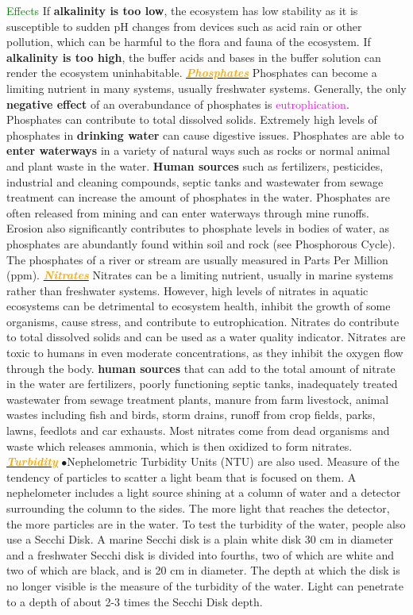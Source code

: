 \documentclass{article}
\newcommand{\ddd}{$\bullet$}
\newcommand{\green}[1]{\textcolor{green}{#1}}
\newcommand{\pink}[1]{\textcolor{magenta}{#1}}
\newcommand{\orange}[1]{\textcolor{orange}{#1}}
\newcommand{\mysubsection}[1]{\underline{\textbf{{\textit{\orange{#1}}}}}}
\newcommand{\mysubsub}[1]{{{\green{#1}}}}
\begin{document}
\begin{multicols*}{4}
            \mysubsub{Effects} If \textbf{alkalinity is too low}, the ecosystem has low stability as it is susceptible to sudden pH changes from devices such as acid rain or other pollution, which can be harmful to the flora and fauna of the ecosystem. If \textbf{alkalinity is too high}, the buffer acids and bases in the buffer solution can render the ecosystem uninhabitable.
        \mysubsection{Phosphates}
            Phosphates can become a limiting nutrient in many systems, usually freshwater systems. Generally, the only \textbf{negative effect} of an overabundance of phosphates is \pink{eutrophication}. Phosphates can contribute to total dissolved solids. Extremely high levels of phosphates in \textbf{drinking water} can cause digestive issues. Phosphates are able to \textbf{enter waterways} in a variety of natural ways such as rocks or normal animal and plant waste in the water. \textbf{Human sources} such as fertilizers, pesticides, industrial and cleaning compounds, septic tanks and wastewater from sewage treatment can increase the amount of phosphates in the water. Phosphates are often released from mining and can enter waterways through mine runoffs. Erosion also significantly contributes to phosphate levels in bodies of water, as phosphates are abundantly found within soil and rock (see Phosphorous Cycle). The phosphates of a river or stream are usually measured in Parts Per Million (ppm).
        \mysubsection{Nitrates}
           Nitrates can be a limiting nutrient, usually in marine systems rather than freshwater systems. However, high levels of nitrates in aquatic ecosystems can be detrimental to ecosystem health, inhibit the growth of some organisms, cause stress, and contribute to eutrophication. Nitrates do contribute to total dissolved solids and can be used as a water quality indicator. Nitrates are toxic to humans in even moderate concentrations, as they inhibit the oxygen flow through the body. \textbf{human sources} that can add to the total amount of nitrate in the water are fertilizers, poorly functioning septic tanks, inadequately treated wastewater from sewage treatment plants, manure from farm livestock, animal wastes including fish and birds, storm drains, runoff from crop fields, parks, lawns, feedlots and car exhausts. Most nitrates come from dead organisms and waste which releases ammonia, which is then oxidized to form nitrates.
        \mysubsection{Turbidity}
            \ddd Nephelometric Turbidity Units (NTU) are also used. Measure of the tendency of particles to scatter a light beam that is focused on them. A nephelometer includes a light source shining at a column of water and a detector surrounding the column to the sides. The more light that reaches the detector, the more particles are in the water. To test the turbidity of the water, people also use a Secchi Disk. A marine Secchi disk is a plain white disk 30 cm in diameter and a freshwater Secchi disk is divided into fourths, two of which are white and two of which are black, and is 20 cm in diameter. The depth at which the disk is no longer visible is the measure of the turbidity of the water. Light can penetrate to a depth of about 2-3 times the Secchi Disk depth. 

\end{multicols*}
\end{document}
